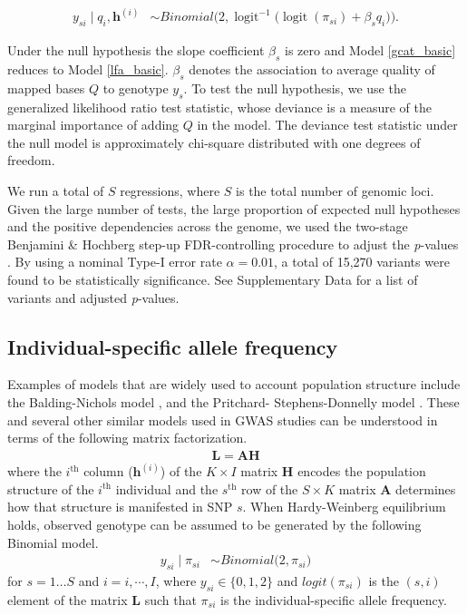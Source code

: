 \documentclass[9pt,article]{template}
\newcommand{\logit}{\operatorname{logit}}
\begin{document}
\begin{align}\label{gcat_basic}
 y_{si} \mid q_i, \boldsymbol{h}^{(i)} &\sim Binomial\bigg( 2, \logit^{-1}\Big(\logit(\pi_{si}) + \beta_s q_i\Big) \bigg).
\end{align} 

Under the null hypothesis the slope coefficient $\beta_s$ is zero and Model \eqref{gcat_basic} reduces to Model \eqref{lfa_basic}. 
$\beta_s$ denotes the association to average quality of mapped bases $Q$ to genotype $y_{s}$. 
To test the null hypothesis, we use the generalized likelihood ratio test statistic, whose deviance is a measure of the marginal importance of adding $Q$ in the model. 
The deviance test statistic under the null model is approximately chi-square distributed with one degrees of freedom.

We run a total of $S$ regressions, where $S$ is the total number of genomic loci. Given the large number of tests, the large proportion of expected null hypotheses and the positive dependencies across the genome, we used the two-stage Benjamini \& Hochberg step-up FDR-controlling procedure to adjust the \textit{p}-values \citep{Benjamini2006}.
By using a nominal Type-I error rate $\alpha = 0.01$, a total of 15,270 variants were found to be statistically significance. 
See Supplementary Data for a list of variants and adjusted \textit{p}-values.

\subsection{Individual-specific allele frequency}
Examples of models that are widely used to account population structure include the Balding-Nichols model \citep{balding1995method}, and the Pritchard- Stephens-Donnelly model \citep{pritchard2000inference}. 
These and several other similar models used in GWAS studies can be understood in terms of the following matrix factorization. 
\begin{align}
\mathbf{L }= \mathbf{AH}
\end{align} 
where the $i^\text{th}$ column ($\boldsymbol{h}^{(i)}$) of the $K \times I$ matrix $\mathbf{H}$ encodes the population structure of the $i^\text{th}$ individual and the $s^\text{th}$ row of the $S \times K$ matrix $\mathbf{A}$ determines how that structure is manifested in SNP $s$. 
When Hardy-Weinberg equilibrium holds, observed genotype can be assumed to be generated by the following Binomial model.
\begin{align} \label{lfa}
y_{si} \mid \pi_{si}  &\sim Binomial\big( 2, \pi_{si} \big) 
\end{align} 
for $s=1\hdots S$ and $i=i,\cdots, I$, where $y_{si} \in \{0,1,2\}$ and $logit(\pi_{si})$ is the $(s,i)$ element of the matrix $\mathbf{L}$ such that  $\pi_{si}$ is the individual-specific allele frequency.
\end{document}
